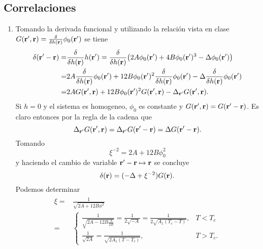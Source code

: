 \documentclass{article}
\begin{document}
\subsection{Correlaciones}

\begin{enumerate}

\item Tomando la derivada funcional y utilizando la relación vista en clase $G(\vb{r'},\vb{r})=\fdv{h(\vb{r})}\phi_0(\vb{r'})$ se tiene
\begin{align}
\begin{split}
\delta(\vb{r'}-\vb{r})=&\fdv{h(\vb{r})}h(\vb{r'})=\fdv{h(\vb{r})}\qty(2A\phi_0(\vb{r'})+4B\phi_0(\vb{r'})^3-\Delta\phi_0(\vb{r'}))\\
=&2A\fdv{h(\vb{r})}\phi_0(\vb{r'})+12B\phi_0(\vb{r'})^2\fdv{h(\vb{r})}\phi_0(\vb{r'})-\Delta\fdv{h(\vb{r})}\phi_0(\vb{r'})\\
=&2AG(\vb{r'},\vb{r})+12B\phi_0(\vb{r'})^2G(\vb{r'},\vb{r})-\Delta_{\vb{r'}} G(\vb{r'},\vb{r}).
\end{split}
\end{align}
Si $h=0$ y el sistema es homogeneo, $\phi_0$ es constante y $G(\vb{r'},\vb{r})=G(\vb{r'}-\vb{r})$. Es claro entonces por la regla de la cadena que
\begin{equation}
\Delta_{\vb{r'}} G(\vb{r'},\vb{r})=\Delta_{\vb{r'}} G(\vb{r'}-\vb{r})=\Delta G(\vb{r'}-\vb{r}).
\end{equation} 
Tomando
\begin{equation}
\xi^{-2}=2A+12B\phi_0^2
\end{equation}
y haciendo el cambio de variable $\vb{r'}-\vb{r}\mapsto\vb{r}$ se concluye
\begin{equation}\label{ec:funcion_green}
\delta(\vb{r})=(-\Delta+\xi^{-2})G(\vb{r}).
\end{equation}
Podemos determinar
\begin{align}
\begin{split}
\xi =& \frac{1}{\sqrt{2A+12B\phi^2}}\\
=&\begin{cases}
\frac{1}{\sqrt{2A-12B\frac{A}{2B}}}=\frac{1}{2\sqrt{-A}}=\frac{1}{2\sqrt{A_1(T_c-T)}}, & T<T_c\\
\frac{1}{\sqrt{2A}}=\frac{1}{\sqrt{2A_1(T-T_c)}}, & T>T_c.
\end{cases}
\end{split}
\end{align}


\end{enumerate}
\end{document}
